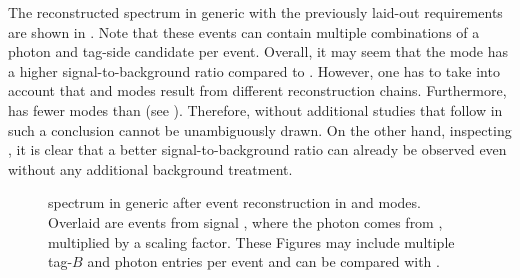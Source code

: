 The reconstructed \BtoXsgamma spectrum in generic \MC with the previously laid-out requirements are shown in .
Note that these events can contain multiple combinations of a photon and tag-side candidate per event.
Overall, it may seem that the \feiBz mode has a higher signal-to-background ratio compared to \feiBp.
However, one has to take into account that \feiBp and \feiBz modes result
from different reconstruction chains.
Furthermore, \feiBz has fewer modes than \feiBp (see ).
Therefore, without additional studies that follow in  such a conclusion cannot be unambiguously drawn. 
On the other hand, inspecting , it is clear that a better signal-to-background ratio can already be observed even without any additional background treatment.

\begin{figure}[hbtp!]
    \centering
    \caption{\label{fig:spectrum_after_reco} \BtoXsgamma spectrum in generic \MC after event reconstruction in \feiBp and \feiBz modes.
    Overlaid are events from signal \MC, where the photon comes from \BtoXsgamma, multiplied by a scaling factor.
    These Figures may include multiple tag-$B$ and photon entries per event and can be compared with .
    }
\end{figure}

